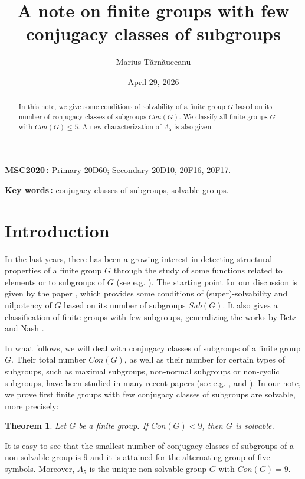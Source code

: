 \documentclass[12pt]{article}
\title{A note on finite groups with few conjugacy classes of subgroups}
\author{Marius T\u arn\u auceanu}
\date{April 29, 2026}
\newtheorem{theorem}{Theorem}[section]
\newcommand{\0}{{\leqno}}
\begin{document}
\maketitle

\begin{abstract}
In this note, we give some conditions of solvability of a finite group $G$ based on its number of conjugacy classes of subgroups $Con(G)$. We classify all finite groups $G$ with $Con(G)\leq 5$. A new characterization of $A_5$ is also given. 
\end{abstract}

{\small
\noindent
{\bf MSC2020\,:} Primary 20D60; Secondary 20D10, 20F16, 20F17.

\noindent
{\bf Key words\,:} conjugacy classes of subgroups, solvable groups.}

\section{Introduction}

In the last years, there has been a growing interest in detecting structural properties of a finite group $G$ through the study of some functions related to elements or to subgroups of $G$ (see e.g. \cite{9}). The starting point for our discussion is given by the paper \cite{7}, which provides some conditions of (super)-solvability and nilpotency of $G$ based on its number of subgroups $Sub(G)$. It also gives a classification of finite groups with few subgroups, generalizing the works by Betz and Nash \cite{4,5}.

In what follows, we will deal with conjugacy classes of subgroups of a finite group $G$. Their total number $Con(G)$, as well as their number for certain types of subgroups, such as maximal subgroups, non-normal subgroups or non-cyclic subgroups, have been studied in many recent papers (see e.g. \cite{6}, \cite{10,11,12,13} and \cite{15}). In our note, we prove first finite groups with few conjugacy classes of subgroups are solvable, more precisely:

\begin{theorem}
Let $G$ be a finite group. If $Con(G)<9$, then $G$ is solvable.
\end{theorem}

It is easy to see that the smallest number of conjugacy classes of subgroups of a non-solvable group is $9$ and it is attained for the alternating group of five symbols. Moreover, $A_5$ is the unique non-solvable group $G$ with $Con(G)=9$.
\end{document}
